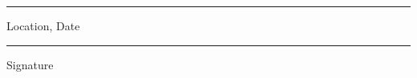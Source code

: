 \documentclass[a4paper]{book}
\begin{document}
\vspace{2cm}

\begin{minipage}[t]{7cm}
\rule{5cm}{0.1mm}
\flushleft
Location, Date
\end{minipage}
\null\hfill
\begin{minipage}[t]{7cm}
\rule{7cm}{0.1mm}
\flushleft
Signature
\end{minipage}





\clearpage
\end{document}
